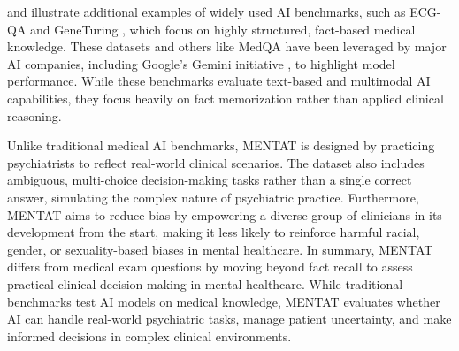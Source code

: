  and  illustrate additional examples of widely used AI benchmarks, such as ECG-QA \cite{Oh2024} and GeneTuring \cite{Hou2023}, which focus on highly structured, fact-based medical knowledge. These datasets and others like MedQA \cite{Jin2021} have been leveraged by major AI companies, including Google’s Gemini initiative \cite{Saab2024}, to highlight model performance. While these benchmarks evaluate text-based and multimodal AI capabilities, they focus heavily on fact memorization rather than applied clinical reasoning.

Unlike traditional medical AI benchmarks, MENTAT is designed by practicing psychiatrists to reflect real-world clinical scenarios. The dataset also includes ambiguous, multi-choice decision-making tasks rather than a single correct answer, simulating the complex nature of psychiatric practice. Furthermore, MENTAT aims to reduce bias by empowering a diverse group of clinicians in its development from the start, making it less likely to reinforce harmful racial, gender, or sexuality-based biases in mental healthcare. In summary, MENTAT differs from medical exam questions by moving beyond fact recall to assess practical clinical decision-making in mental healthcare. While traditional benchmarks test AI models on medical knowledge, MENTAT evaluates whether AI can handle real-world psychiatric tasks, manage patient uncertainty, and make informed decisions in complex clinical environments.




